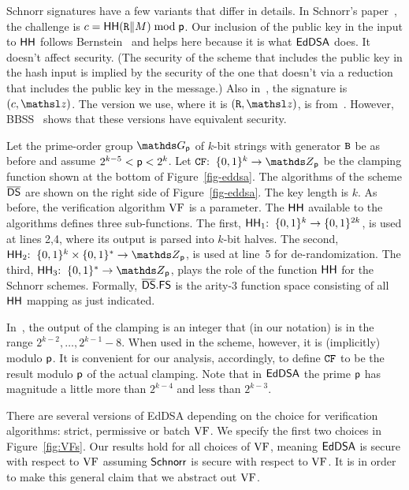 Schnorr signatures have a few variants that differ in details. In Schnorr's paper~\cite{JC:Schnorr91}, the challenge is $c = \mathsf{HH}(\mathtt{R}\|{M}) \bmod \mathsf{p}$. Our inclusion of the public key in the input to $\mathsf{HH}$ follows Bernstein~\cite{EPRINT:Bernstein15} and helps here because it is what $\mathsf{EdDSA}$ does. It doesn't affect security. (The security of the scheme that includes the public key in the hash input is implied by the security of the one that doesn't via a reduction that includes the public key in the message.) Also in~\cite{JC:Schnorr91}, the signature is $(c, \z)$. The version we use, where it is $(\curvepoint{R},\z)$, is from~\cite{EC:AABN02}. However, BBSS~\cite{NORDSEC:BBSS18} shows that these versions have equivalent security.





 Let the prime-order group $\G_{\Prime}$ of $k$-bit strings with generator $\mathtt{B}$ be as before and assume $2^{k-5} < \mathsf{p} < 2^k$. Let $\CFEDSA\Colon\bits^k\to \Z_{\Prime}$ be the clamping function shown at the bottom of Figure~\ref{fig-eddsa}. The algorithms of the scheme $\overline{\mathsf{DS}}$ are shown on the right side of Figure~\ref{fig-eddsa}. The key length is $k$. As before, the verification algorithm $\mathrm{VF}$ is a parameter. The $\mathsf{HH}$ available to the algorithms defines three sub-functions. The first, $\mathsf{HH}_1{:\;\;}\{0,1\}^k\to\{0,1\}^{2k}$, is used at lines 2,4, where its output is parsed into $k$-bit halves. The second, $\HH_2\Colon\bits^k\cross\bits^*\to\Z_{\Prime}$, is used at line~5 for de-randomization. The third, $\HH_3\Colon\bits^*\to\Z_{\Prime}$, plays the role of the function $\mathsf{HH}$ for the Schnorr schemes. Formally, $\overline{\mathsf{DS}}.\mathsf{FS}$ is the arity-3 function space consisting of all $\mathsf{HH}$ mapping as just indicated.

In~\cite{bernstein2012high,SP:BCJZ21}, the output of the clamping is an integer that (in our notation) is in the range $2^{k-2},\ldots,2^{k-1}-8$. When used in the scheme, however, it is (implicitly) modulo $\mathsf{p}$. It is convenient for our analysis, accordingly, to define $\mathtt{CF}$ to be the result modulo $\mathsf{p}$ of the actual clamping. Note that in $\mathsf{EdDSA}$ the prime $\mathsf{p}$ has magnitude a little more than $2^{k-4}$ and less than $2^{k-3}$.

There are several versions of EdDSA depending on the choice for verification algorithms: strict,  permissive or batch $\mathrm{VF}$. We specify the first two choices in Figure~\ref{fig:VFs}. Our results hold for all choices of $\mathrm{VF}$, meaning $\mathsf{EdDSA}$ is secure with respect to $\mathrm{VF}$ assuming $\mathsf{Schnorr}$ is secure with respect to $\mathrm{VF}$. It is in order to make this general claim that we abstract out $\mathrm{VF}$. 

